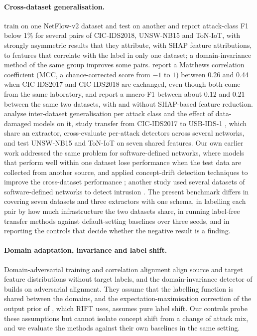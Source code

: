 \documentclass[11pt]{article}
\begin{document}
\paragraph{Cross-dataset generalisation.}
\citet{layeghy2023explainable} train on one NetFlow-v2 dataset and test on another and report attack-class F1 below 1\% for several pairs of CIC-IDS2018, UNSW-NB15 and ToN-IoT, with strongly asymmetric results that they attribute, with SHAP feature attributions, to features that correlate with the label in only one dataset; a domain-invariance method of the same group \citep{layeghy2023dinids} improves some pairs.
\citet{cantone2024crossdataset} report a Matthews correlation coefficient (MCC, a chance-corrected score from $-1$ to $1$) between 0.26 and 0.44 when CIC-IDS2017 and CIC-IDS2018 are exchanged, even though both come from the same laboratory, and \citet{kilic2026shap} report a macro-F1 between about 0.12 and 0.21 between the same two datasets, with and without SHAP-based feature reduction.
\citet{dhooge2020inter,dhooge2023damaged} analyse inter-dataset generalisation per attack class and the effect of data-damaged models on it, \citet{catillo2022transferability} study transfer from CIC-IDS2017 to USB-IDS-1 \citep{catillo2021usbids1}, which share an extractor, \citet{apruzzese2022cross} cross-evaluate per-attack detectors across several networks, and \citet{hossain2026assessing} test UNSW-NB15 and ToN-IoT on seven shared features.
Our own earlier work addressed the same problem for software-defined networks, where models that perform well within one dataset lose performance when the test data are collected from another source, and applied concept-drift detection techniques to improve the cross-dataset performance \citep{dang2023learning}; another study used several datasets of software-defined networks to detect intrusion \citep{dang2022multisdn}.
The present benchmark differs in covering seven datasets and three extractors with one schema, in labelling each pair by how much infrastructure the two datasets share, in running label-free transfer methods against default-setting baselines over three seeds, and in reporting the controls that decide whether the negative result is a finding.

\paragraph{Domain adaptation, invariance and label shift.}
Domain-adversarial training \citep{ganin2016dann} and correlation alignment \citep{sun2016coral} align source and target feature distributions without target labels, and the domain-invariance detector of \citet{layeghy2023dinids} builds on adversarial alignment.
They assume that the labelling function is shared between the domains, and the expectation-maximisation correction of the output prior of \citet{saerens2002adjusting}, which RIFT uses, assumes pure label shift.
Our controls probe these assumptions but cannot isolate concept shift from a change of attack mix, and we evaluate the methods against their own baselines in the same setting.
\end{document}
